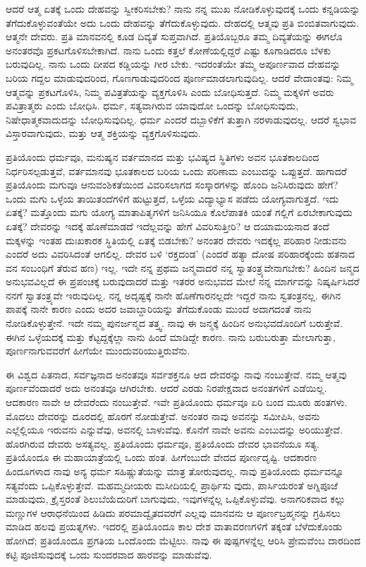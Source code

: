 ಆದರೆ ಆತ್ಮ ಏತಕ್ಕೆ ಒಂದು ದೇಹವನ್ನು ಸ್ವೀಕರಿಸಬೇಕು? ನಾನು ನನ್ನ ಮುಖ ನೋಡಿಕೊಳ್ಳುವುದಕ್ಕೆ ಒಂದು ಕನ್ನಡಿಯನ್ನು ತೆಗೆದುಕೊಳ್ಳುವಂತೆಯೇ ಅದು ಒಂದು ದೇಹವನ್ನು ತೆಗೆದುಕೊಳ್ಳುವುದು. ದೇಹದಲ್ಲಿ ಆತ್ಮವು ಪ್ರತಿ ಬಿಂಬಿತವಾಗುವುದು. ಆತ್ಮನೇ ದೇವರು. ಪ್ರತಿ ಮಾನವನಲ್ಲಿ ಕೂಡ ದಿವ್ಯತೆ ಸುಪ್ತವಾಗಿದೆ. ಪ್ರತಿಯೊಬ್ಬರೂ ತಮ್ಮ ದಿವ್ಯತೆಯನ್ನು ಈಗಲೊ ಅನಂತರವೊ ಪ್ರಕಟಗೊಳಿಸಬೇಕಾಗಿದೆ. ನಾನು ಒಂದು ಕತ್ತಲೆ ಕೋಣೆಯಲ್ಲಿದ್ದರೆ ಎಷ್ಟು ಕೂಗಾಡಿದರೂ ಬೆಳಕು ಬರುವುದಿಲ್ಲ. ನಾನು ಒಂದು ದೀಪದ ಕಡ್ಡಿಯನ್ನು ಗೀರ ಬೇಕು. ಇದರಂತೆಯೇ ತಮ್ಮ ಅಪೂರ್ಣವಾದ ದೇಹವನ್ನು ಬರಿಯ ಗದ್ದಲ ಮಾಡುವುದರಿಂದ, ಗೊಣಗಾಡುವುದರಿಂದ ಪೂರ್ಣಮಾಡಲಾಗುವುದಿಲ್ಲ. ಆದರೆ ವೇದಾಂತವು: ನಿಮ್ಮ ಆತ್ಮವನ್ನು ಪ್ರಕಟಗೊಳಿಸಿ, ನಿಮ್ಮ ಪವಿತ್ರತೆಯನ್ನು ವ್ಯಕ್ತಗೊಳಿಸಿ ಎಂದು ಬೋಧಿಸುತ್ತದೆ. ನಿಮ್ಮ ಮಕ್ಕಳಿಗೆ ಅವರು ಪವಿತ್ರಾತ್ಮರು ಎಂದು ಬೋಧಿಸಿ. ಧರ್ಮ, ಸತ್ಯವಾಗಿರುವ ಯಾವುದೋ ಒಂದನ್ನು ಬೋಧಿಸುವುದು, ನಿಷೇಧಾತ್ಮಕವಾದುದನ್ನು ಬೋಧಿಸುವುದಿಲ್ಲ. ಧರ್ಮ ಎಂದರೆ ದಬ್ಬಾಳಿಕೆಗೆ ತುತ್ತಾಗಿ ನರಳಾಡುವುದಲ್ಲ. ಆದರೆ ಸ್ವಭಾವ ವಿಸ್ತಾರವಾಗುವುದು, ಮತ್ತು ಆತ್ಮ ಶಕ್ತಿಯನ್ನು ವ್ಯಕ್ತಗೊಳಿಸುವುದು.

ಪ್ರತಿಯೊಂದು ಧರ್ಮವೂ, ಮನುಷ್ಯನ ವರ್ತಮಾನದ ಮತ್ತು ಭವಿಷ್ಯದ ಸ್ಥಿತಿಗಳು ಅವನ ಭೂತಕಾಲದಿಂದ ನಿರ್ಧರಿಸಲ್ಪಡುತ್ತವೆ, ವರ್ತಮಾನವು ಭೂತಕಾಲದ ಬರಿಯ ಒಂದು ಪರಿಣಾಮ ಎಂಬುದನ್ನು ಒಪ್ಪುತ್ತದೆ. ಹಾಗಾದರೆ ಪ್ರತಿಯೊಂದು ಮಗುವೂ ಆನುವಂಶಿಕತೆಯಿಂದ ವಿವರಿಸಲಾಗದ ಸಂಸ್ಕಾರಗಳನ್ನು ಹೊಂದಿ ಜನಿಸಿರುವುದು ಹೇಗೆ? ಒಂದು ಮಗು ಒಳ್ಳೆಯ ತಾಯಿತಂದೆಗಳಿಗೆ ಹುಟ್ಟುತ್ತದೆ, ಒಳ್ಳೆಯ ವಿದ್ಯಾಭ್ಯಾಸ ಪಡೆದು ಯೋಗ್ಯವಾಗುತ್ತದೆ. ಇದು ಏತಕ್ಕೆ? ಮತ್ತೊಂದು ಮಗು ಯೋಗ್ಯ ಮಾತಾಪಿತೃಗಳಿಗೆ ಜನಿಸಿಯೂ ಕೊಲೆಪಾತಕಿ ಯಂತೆ ಗಲ್ಲಿಗೆ ಏರಬೇಕಾಗುವುದು ಏತಕ್ಕೆ? ದೇವರನ್ನು ಇದಕ್ಕೆ ಹೊಣೆಮಾಡದೆ ಇದೆಲ್ಲವನ್ನು ಹೇಗೆ ವಿವರಿಸುತ್ತೀರಿ? ಆ ದಯಾಮಯನಾದ ತಂದೆ ಮಕ್ಕಳನ್ನು ಇಂತಹ ದುಃಖಕಾರಕ ಸ್ಥಿತಿಯಲ್ಲಿ ಏತಕ್ಕೆ ಬಿಡಬೇಕು? ಅನಂತರ ದೇವರು ಇದಕ್ಕೆಲ್ಲ ಪರಿಹಾರ ನೀಡುವನು ಎಂದರೆ ಅದು ವಿವರಿಸಿದಂತೆ ಆಗಲಿಲ್ಲ. ದೇವರ ಬಳಿ ‘ರಕ್ತದಂಡ’ (ಎಂದರೆ ಹತ್ಯಾ ದೋಷ ಪರಿಹಾರಕ್ಕೆಂದು ಹತನಾದ ವನ ಸಂಬಂಧಿಗೆ ತೆರುವ ಹಣ) ಇಲ್ಲ. ಇದೇ ನನ್ನ ಪ್ರಥಮ ಜನ್ಮವಾದರೆ ನನ್ನ ಸ್ವಾತಂತ್ರ್ಯವೇನಾಗಬೇಕು? ಹಿಂದಿನ ಜನ್ಮದ ಅನುಭವವಿಲ್ಲದೆ ಈ ಪ್ರಪಂಚಕ್ಕೆ ಬರುವುದಾದರೆ ಮತ್ತು ಇತರರ ಅನುಭವದ ಮೇಲೆ ನನ್ನ ಮಾರ್ಗವನ್ನು ನಿಷ್ಕರ್ಷಿಸಿದರೆ ನನಗೆ ಸ್ವಾತಂತ್ರ್ಯವೇ ಇರುವುದಿಲ್ಲ. ನನ್ನ ಅದೃಷ್ಟಕ್ಕೆ ನಾನೇ ಹೊಣೆಗಾರನಲ್ಲದೇ ಇದ್ದರೆ ನಾನು ಸ್ವತಂತ್ರನಲ್ಲ. ಈಗಿನ ಪಾಪಕ್ಕೆ ನಾನೇ ಕಾರಣ ಎಂದು ಅದರ ಜವಾಬ್ದಾರಿಯನ್ನು ತೆಗೆದುಕೊಂಡು ಮುಂದೆ ಅದಾಗದಂತೆ ನಾನು ನೋಡಿಕೊಳ್ಳುತ್ತೇನೆ. ಇದೇ ನಮ್ಮ ಪುನರ್ಜನ್ಮದ ತತ್ತ್ವ. ನಾವು ಈ ಜನ್ಮಕ್ಕೆ ಹಿಂದಿನ ಅನುಭವದೊಂದಿಗೆ ಬರುತ್ತೇವೆ. ಈಗಿನ ಒಳ್ಳೆಯದಕ್ಕೆ ಮತ್ತು ಕೆಟ್ಟದ್ದಕ್ಕೆಲ್ಲಾ ನಾನು ಹಿಂದೆ ಮಾಡಿದ್ದೇ ಕಾರಣ. ನಾನು ಬರುಬರುತ್ತಾ ಮೇಲಾಗುತ್ತಾ, ಪೂರ್ಣನಾಗುವವರೆಗೆ ಹೀಗೆಯೇ ಮುಂದುವರಿಯುತ್ತಿರುವೆನು.

ಈ ವಿಶ್ವದ ಪಿತನಾದ, ಸರ್ವಜ್ಞನಾದ ಅನಂತವೂ ಸರ್ವಶಕ್ತನೂ ಆದ ದೇವರನ್ನು ನಾವು ನಂಬುತ್ತೇವೆ. ನಮ್ಮ ಆತ್ಮವು ಪೂರ್ಣವೆಂದಾದರೆ ಅದು ಅನಂತವೂ ಆಗಿರಬೇಕು. ಆದರೆ ಎರಡು ನಿರಪೇಕ್ಷವಾದ ಅನಂತಗಳಿಗೆ ಎಡೆಯಿಲ್ಲ. ಆದಕಾರಣ ನಾವೇ ಆ ದೇವರೆಂದು ನಂಬುತ್ತೇವೆ. ಇವೇ ಪ್ರತಿಯೊಂದು ಧರ್ಮವೂ ಏರಿ ಬಂದ ಮೂರು ಹಂತಗಳು. ಮೊದಲು ದೇವರನ್ನು ದೂರದಲ್ಲಿ ಹೊರಗೆ ನೋಡುತ್ತೇವೆ. ಅನಂತರ ನಾವು ಅವನನ್ನು ಸಮೀಪಿಸಿ, ಅವನು ಎಲ್ಲೆಲ್ಲಿಯೂ ಇರುವನು ಎನ್ನುವೆವು, ಅವನಲ್ಲಿ ಬಾಳುವೆವು. ಕೊನೆಗೆ ನಾವೇ ಅವನು ಎಂಬುದನ್ನು ಅರಿಯುತ್ತೇವೆ. ಹೊರಗಿರುವ ದೇವರು ಅಸತ್ಯವಲ್ಲ. ಪ್ರತಿಯೊಂದು ಧರ್ಮವೂ, ಪ್ರತಿಯೊಂದು ದೇವರ ಭಾವನೆಯೂ ಸತ್ಯ. ಪ್ರತಿಯೊಂದೂ ಈ ಮಹಾಯಾತ್ರೆಯಲ್ಲಿ ಒಂದು ಹಂತ. ಹೀಗೆಂಬುದೇ ವೇದದ ಪೂರ್ಣದೃಷ್ಟಿ. ಆದಕಾರಣ ಹಿಂದೂಗಳಾದ ನಾವು ಅನ್ಯ ಧರ್ಮ ಸಹಿಷ್ಣುತೆಯನ್ನು ಮಾತ್ರ ತೋರುವುದಲ್ಲ. ನಾವು ಪ್ರತಿಯೊಂದು ಧರ್ಮವನ್ನೂ ಸತ್ಯವೆಂದು ಒಪ್ಪಿಕೊಳ್ಳುತ್ತೇವೆ. ಮಹಮ್ಮದೀಯರು ಮಸೀದಿಯಲ್ಲಿ ಪ್ರಾರ್ಥಿಸು ವುದು, ಪಾರ್ಸಿಯರಂತೆ ಅಗ್ನಿಪೂಜೆ ಮಾಡುವುದು, ಕ್ರೈಸ್ತರಂತೆ ಶಿಲುಬೆಯೆದುರಿಗೆ ಬಾಗುವುದು, ಇವುಗಳನ್ನೆಲ್ಲ ಒಪ್ಪಿಕೊಳ್ಳುವೆವು. ಅನಾಗರಿಕವಾದ ಕಲ್ಲು ಮಣ್ಣುಗಳ ಆರಾಧನೆಯಿಂದ ಹಿಡಿದು ಪರಮಾದ್ವೈತದವರೆಗೆ ಎಲ್ಲವು ಮಾನವನು ಆ ಪೂರ್ಣಬ್ರಹ್ಮನನ್ನು ಗ್ರಹಿಸಲು ಮಾಡಿದ ಹಲವು ಪ್ರಯತ್ನಗಳು. ಇದರಲ್ಲಿ ಪ್ರತಿಯೊಂದೂ ಕಾಲ ದೇಶ ವಾತಾವರಣಗಳಿಗೆ ತಕ್ಕಂತೆ ಬೆಳೆದುಕೊಂಡು ಹೋಗಿದೆ; ಪ್ರತಿಯೊಂದೂ ಪ್ರಗತಿಯ ಒಂದೊಂದು ಮೆಟ್ಟಿಲು. ನಾವು ಈ ಪುಷ್ಪಗಳನ್ನೆಲ್ಲ ಆರಿಸಿ ಪ್ರೇಮವೆಂಬ ದಾರದಿಂದ ಕಟ್ಟಿ ಪೂಜಿಸುವುದಕ್ಕೆ ಒಂದು ಸುಂದರವಾದ ಹಾರವನ್ನು ಮಾಡುವೆವು.

